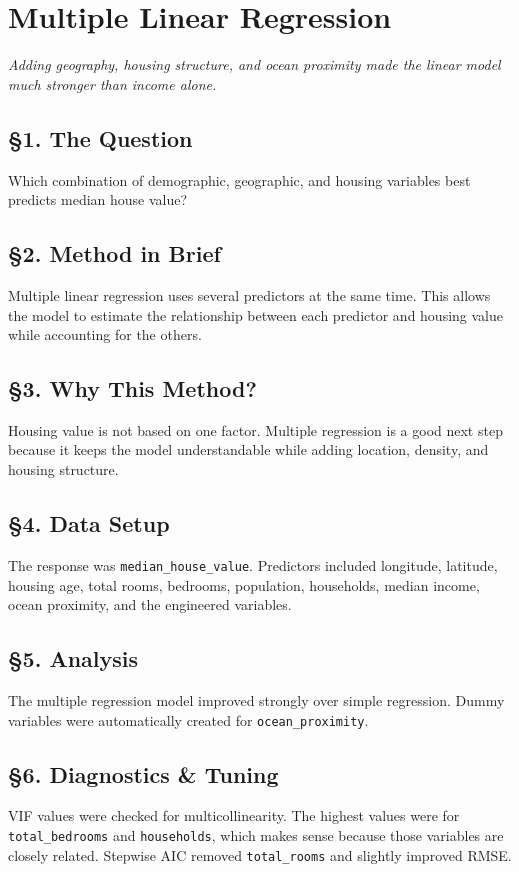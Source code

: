 \documentclass[12pt]{report}
\begin{document}
\newpage

\chapter{Multiple Linear Regression}

\begin{center}
\textit{Adding geography, housing structure, and ocean proximity made the linear model much stronger than income alone.}
\end{center}

\section*{\S1. The Question}
Which combination of demographic, geographic, and housing variables best predicts median house value?

\section*{\S2. Method in Brief}
Multiple linear regression uses several predictors at the same time. This allows the model to estimate the relationship between each predictor and housing value while accounting for the others.

\section*{\S3. Why This Method?}
Housing value is not based on one factor. Multiple regression is a good next step because it keeps the model understandable while adding location, density, and housing structure.

\section*{\S4. Data Setup}
The response was \texttt{median\_house\_value}. Predictors included longitude, latitude, housing age, total rooms, bedrooms, population, households, median income, ocean proximity, and the engineered variables.

\section*{\S5. Analysis}
The multiple regression model improved strongly over simple regression. Dummy variables were automatically created for \texttt{ocean\_proximity}.

\section*{\S6. Diagnostics \& Tuning}
VIF values were checked for multicollinearity. The highest values were for \texttt{total\_bedrooms} and \texttt{households}, which makes sense because those variables are closely related. Stepwise AIC removed \texttt{total\_rooms} and slightly improved RMSE.
\end{document}
